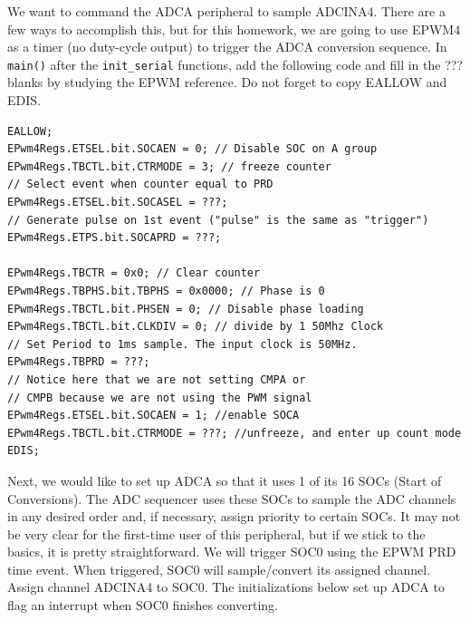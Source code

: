 \documentclass[11pt]{article}
\begin{document}
We want to command the ADCA peripheral to sample ADCINA4. There are a few ways to accomplish this, but for this homework, we are going to use EPWM4 as a timer (no duty-cycle output) to trigger the ADCA conversion sequence. In \texttt{main()} after the \texttt{init_serial} functions, add the following code and fill in the ??? blanks by studying the EPWM reference. Do not forget to copy EALLOW and EDIS.
%
\begin{verbatim}
EALLOW;
EPwm4Regs.ETSEL.bit.SOCAEN = 0; // Disable SOC on A group
EPwm4Regs.TBCTL.bit.CTRMODE = 3; // freeze counter
// Select event when counter equal to PRD
EPwm4Regs.ETSEL.bit.SOCASEL = ???;
// Generate pulse on 1st event ("pulse" is the same as "trigger")
EPwm4Regs.ETPS.bit.SOCAPRD = ???;

EPwm4Regs.TBCTR = 0x0; // Clear counter
EPwm4Regs.TBPHS.bit.TBPHS = 0x0000; // Phase is 0
EPwm4Regs.TBCTL.bit.PHSEN = 0; // Disable phase loading
EPwm4Regs.TBCTL.bit.CLKDIV = 0; // divide by 1 50Mhz Clock
// Set Period to 1ms sample. The input clock is 50MHz.
EPwm4Regs.TBPRD = ???;
// Notice here that we are not setting CMPA or
// CMPB because we are not using the PWM signal
EPwm4Regs.ETSEL.bit.SOCAEN = 1; //enable SOCA
EPwm4Regs.TBCTL.bit.CTRMODE = ???; //unfreeze, and enter up count mode
EDIS;
\end{verbatim}
%
Next, we would like to set up ADCA so that it uses 1 of its 16 SOCs (Start of Conversions). The ADC sequencer uses these SOCs to sample the ADC channels in any desired order and, if necessary, assign priority to certain SOCs. It may not be very clear for the first-time user of this peripheral, but if we stick to the basics, it is pretty straightforward. We will trigger SOC0 using the EPWM PRD time event. When triggered, SOC0 will sample/convert its assigned channel. Assign channel ADCINA4 to SOC0. The initializations below set up ADCA to flag an interrupt when SOC0 finishes converting.
\end{document}
